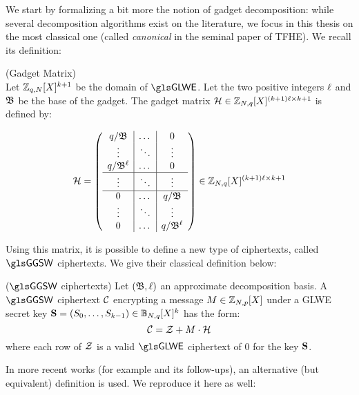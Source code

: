 We start by formalizing a bit more the notion of gadget decomposition: while several decomposition algorithms exist on the literature, we focus in this thesis on the most classical one (called \textit{canonical} in the seminal paper of \gls{TFHE}). We recall its definition:

	
\begin{definition}(Gadget Matrix)\\
	Let $\mathbb{Z}_{q, N}[X]^{k+1}$ be the domain of $\GLWE$. Let the two positive integers $\ell$ and $\mathfrak{B}$ be the base of the gadget. The gadget matrix $\mathcal H \in \mathbb{Z}_{N, q}[X]^{(k+1)\ell \times k+1}$ is defined by:
	
	\[
	\mathcal H = 
	\left(
	\begin{array}{c|c|c}
		q / \mathfrak{B} & \dots & 0 \\
		\vdots & \ddots & \vdots  \\
		q / \mathfrak{B}^{\ell} & \dots & 0 \\
		\hline
		\vdots & \ddots & \vdots \\
		\hline
		0 & \dots & q / \mathfrak{B} \\
		\vdots & \ddots & \vdots  \\
		0 & \dots & q / \mathfrak{B}^{\ell}\\
	\end{array}
	\right) \in \mathbb{Z}_{N, q}[X]^{(k+1)\ell \times k+1}
	\]
\end{definition}
	


Using this matrix, it is possible to define a new type of ciphertexts, called $\GGSW$ ciphertexts. We give their classical definition below:


\begin{definition}($\GGSW$ ciphertexts)
	\label{def:ggsw}
	Let $(\mathfrak{B}, \ell)$ an approximate decomposition basis. A $\GGSW$ ciphertext $\mathcal C$ encrypting a message $M \in \mathbb{Z}_{N,p}[X]$ under a GLWE secret key $\mathbf S =  (S_0, \dots, S_{k-1}) \in \mathbb{B}_{N, q}[X]^k$ has the form:
	\begin{equation*}
		\mathcal C = \mathcal Z + M \cdot \mathcal H
	\end{equation*}
	where each row of $\mathcal Z$ is a valid $\GLWE$ ciphertext of 0 for the key $\mathbf S$. 
	
\end{definition}


In more recent works (for example \cite{AC:CLOT21} and its follow-ups), an alternative (but equivalent) definition is used. We reproduce it here as well:

